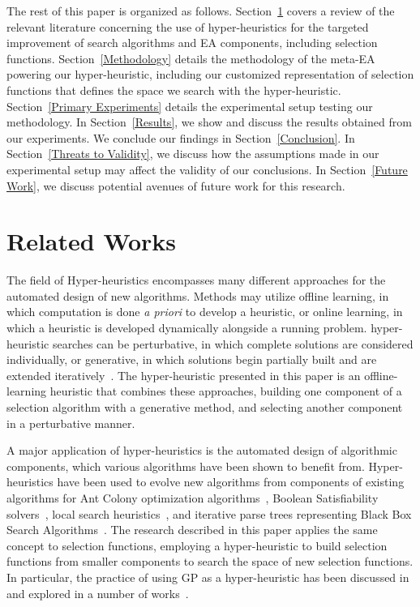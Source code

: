 \documentclass[sigconf]{acmart}
\begin{document}
The rest of this paper is organized as follows. Section~\ref{Literature Review} covers a review of the relevant literature concerning the use of hyper-heuristics for the targeted improvement of search algorithms and EA components, including selection functions. Section~\ref{Methodology} details the methodology of the meta-EA powering our hyper-heuristic, including our customized representation of selection functions that defines the space we search with the hyper-heuristic.  Section~\ref{Primary Experiments} details the experimental setup testing our methodology. In Section~\ref{Results}, we show and discuss the results obtained from our experiments. We conclude our findings in Section~\ref{Conclusion}. In Section~\ref{Threats to Validity}, we discuss how the assumptions made in our experimental setup may affect the validity of our conclusions. In Section~\ref{Future Work}, we discuss potential avenues of future work for this research.

\section{Related Works}
\label{Literature Review}
The field of Hyper-heuristics encompasses many different approaches for the automated design of new algorithms. Methods may utilize offline learning, in which computation is done \textit{a priori} to develop a heuristic, or online learning, in which a heuristic is developed dynamically alongside a running problem. hyper-heuristic searches can be perturbative, in which complete solutions are considered individually, or generative, in which solutions begin partially built and are extended iteratively~\citep{burke2013HHstateoftheart}. The hyper-heuristic presented in this paper is an offline-learning heuristic that combines these approaches, building one component of a selection algorithm with a generative method, and selecting another component in a perturbative manner.

A major application of hyper-heuristics is the automated design of algorithmic components, which various algorithms have been shown to benefit from. Hyper-heuristics have been used to evolve new algorithms from components of existing algorithms for Ant Colony optimization algorithms~\citep{lopez2012antcol}, Boolean Satisfiability solvers~\citep{khudabukhsh2009satenstein}, local search heuristics~\citep{burke2012localHeuristics}, and iterative parse trees representing Black Box Search Algorithms~\citep{martin2013evolvingBBSA}. The research described in this paper applies the same concept to selection functions, employing a hyper-heuristic to build selection functions from smaller components to search the space of new selection functions. In particular, the practice of using GP as a hyper-heuristic has been discussed in~\citep{burke2009exploring} and explored in a number of works~\citep{burke2010strippacking, burke2006binpacking, harris2015comparison}. 
\end{document}
